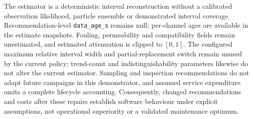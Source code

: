 The estimator is a deterministic interval reconstruction without a calibrated observation likelihood, particle ensemble or demonstrated interval coverage. Recommendation-level \texttt{data\_age\_s} remains null; per-channel ages are available in the estimate snapshots. Fouling, permeability and compatibility fields remain unestimated, and estimated attenuation is clipped to $[0,1]$. The configured maximum relative interval width and partial-replacement switch remain unused by the current policy; trend-count and indistinguishability parameters likewise do not alter the current estimator. Sampling and inspection recommendations do not adapt future campaigns in this demonstrator, and assumed service expenditure omits a complete lifecycle accounting. Consequently, changed recommendations and costs after these repairs establish software behaviour under explicit assumptions, not operational superiority or a validated maintenance optimum.
